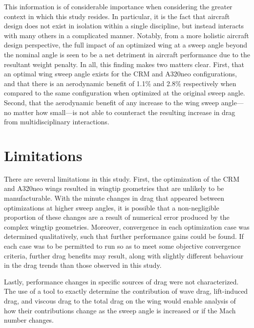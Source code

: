 This information is of considerable importance when considering the greater context in which this study resides. In particular, it is the fact that aircraft design does not exist in isolation within a single discipline, but instead interacts with many others in a complicated manner. Notably, from a more holistic aircraft design perspective, the full impact of an optimized wing at a sweep angle beyond the nominal angle is seen to be a net detriment in aircraft performance due to the resultant weight penalty. In all, this finding makes two matters clear. First, that an optimal wing sweep angle exists for the CRM and A320neo configurations, and that there is an aerodynamic benefit of 1.1\% and 2.8\% respectively when compared to the same configuration when optimized at the original sweep angle. Second, that the aerodynamic benefit of any increase to the wing sweep angle—no matter how small—is not able to counteract the resulting increase in drag from multidisciplinary interactions.

\section{Limitations}
There are several limitations in this study. First, the optimization of the CRM and A320neo wings resulted in wingtip geometries that are unlikely to be manufacturable. With the minute changes in drag that appeared between optimizations at higher sweep angles, it is possible that a non-negligible proportion of these changes are a result of numerical error produced by the complex wingtip geometries. Moreover, convergence in each optimization case was determined qualitatively, such that further performance gains could be found. If each case was to be permitted to run so as to meet some objective convergence criteria, further drag benefits may result, along with slightly different behaviour in the drag trends than those observed in this study. 

Lastly, performance changes in specific sources of drag were not characterized. The use of a tool to exactly determine the contribution of wave drag, lift-induced drag, and viscous drag to the total drag on the wing would enable analysis of how their contributions change as the sweep angle is increased or if the Mach number changes.